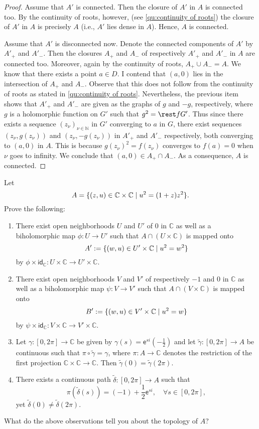 \documentclass[a4paper]{amsart}
\newcommand{\N}{\mathbb{N}}
\newcommand{\C}{\mathbb{C}}
\newcommand{\id}[1]{\mathsf{id}_{#1}}
\newcommand{\ee}[1]{\mathsf{e}^{#1}}
\theoremstyle{remark}
\numberwithin{equation}{question}
\DeclarePairedDelimiter\set{\{}{\}}
\begin{document}
\begin{solution}
\begin{solenum}
\begin{proof}
Assume that $A'$ is connected. Then the closure of $A'$ in $A$ is connected too. By the continuity of roots, however, (see \cref{qu:continuity of roots}) the closure of $A'$ in $A$ is precisely $A$ (i.e., $A'$ lies dense in $A$). Hence, $A$ is connected.

Assume that $A'$ is disconnected now. Denote the connected components of $A'$ by $A'_+$ and $A'_-$. Then the closures $A_+$ and $A_-$ of respectively $A'_+$ and $A'_-$ in $A$ are connected too. Moreover, again by the continuity of roots, $A_+ \cup A_- = A$. We know that there exists a point $a \in D$. I contend that $(a,0)$ lies in the intersection of $A_+$ and $A_-$. Observe that this does not follow from the continuity of roots as stated in \cref{qu:continuity of roots}. Nevertheless, the previous item shows that $A'_+$ and $A'_-$ are given as the graphs of $g$ and $-g$, respectively, where $g$ is a holomorphic function on $G'$ such that $g^2 = \rest f{G'}$. Thus since there exists a sequence $(z_\nu)_{\nu \in \N}$ in $G'$ converging to $a$ in $G$, there exist sequences $(z_\nu,g(z_\nu))$ and $(z_\nu,-g(z_\nu))$ in $A'_+$ and $A'_-$ respectively, both converging to $(a,0)$ in $A$. This is because $g(z_\nu)^2 = f(z_\nu)$ converges to $f(a) = 0$ when $\nu$ goes to infinity. We conclude that $(a,0) \in A_+ \cap A_-$. As a consequence, $A$ is connected.
\end{proof}
\end{solenum}
\end{solution}

\begin{question}[name=Exercise*]
\label{qu:singular cubic}
Let
\[
A = \set{(z,u) \in \C \times \C \mid u^2 = (1+z)z^2}.
\]
Prove the following:
\begin{enumerate}
\item There exist open neighborhoods $U$ and $U'$ of $0$ in $\C$ as well as a biholomorphic map $\phi \colon U \to U'$ such that $A \cap (U \times \C)$ is mapped onto
\[
A' := \set{(w,u) \in U' \times \C \mid u^2 = w^2}
\]
by $\phi \times \id\C \colon U \times \C \to U' \times \C$.
\item There exist open neighborhoods $V$ and $V'$ of respectively $-1$ and $0$ in $\C$ as well as a biholomorphic map $\psi \colon V \to V'$ such that $A \cap (V \times \C)$ is mapped onto
\[
B' := \set{(w,u) \in V' \times \C \mid u^2 = w}
\]
by $\psi \times \id\C \colon V \times \C \to V' \times \C$.
\item Let $\gamma \colon [0,2\pi] \to \C$ be given by $\gamma(s) = \ee{si}(-\frac12)$ and let $\tilde\gamma \colon [0,2\pi] \to A$ be continuous such that $\pi \circ \tilde\gamma = \gamma$, where $\pi \colon A \to \C$ denotes the restriction of the first projection $\C \times \C \to \C$. Then $\tilde\gamma(0) = \tilde\gamma(2\pi)$.
\item There exists a continuous path $\tilde\delta \colon [0,2\pi] \to A$ such that
\[
\pi(\tilde\delta(s)) = (-1) + \frac12\ee{si}, \quad \forall s \in [0,2\pi],
\]
yet $\tilde\delta(0) \ne \tilde\delta(2\pi)$.
\end{enumerate}
What do the above observations tell you about the topology of $A$?
\end{question}
\end{document}
